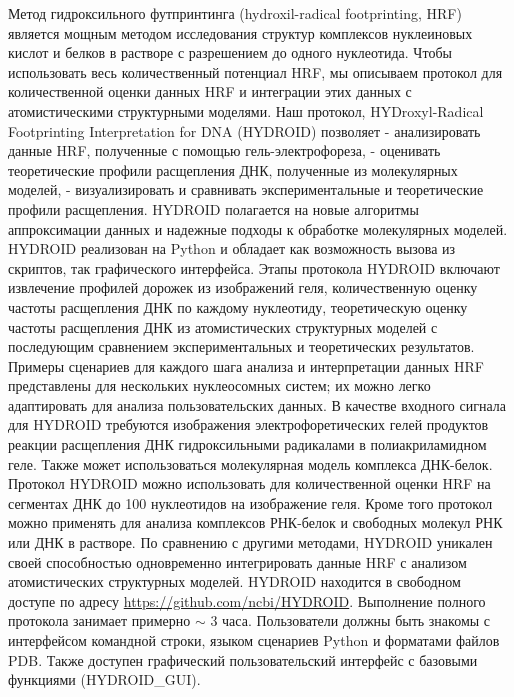 
Метод гидроксильного футпринтинга (hydroxil-radical footprinting, HRF) является мощным методом исследования структур комплексов нуклеиновых кислот и белков в растворе с разрешением до одного нуклеотида. Чтобы использовать весь количественный потенциал HRF, мы описываем протокол для количественной оценки данных HRF и интеграции этих данных с атомистическими структурными моделями. Наш протокол, HYDroxyl-Radical Footprinting Interpretation for DNA (HYDROID) позволяет - анализировать данные HRF, полученные с помощью гель-электрофореза, - оценивать теоретические профили расщепления ДНК, полученные из молекулярных моделей, - визуализировать и сравнивать экспериментальные и теоретические профили расщепления. HYDROID полагается на новые алгоритмы аппроксимации данных и надежные подходы к обработке молекулярных моделей. HYDROID реализован на Python и обладает как возможность вызова из скриптов, так графического интерфейса. Этапы протокола HYDROID включают извлечение профилей дорожек из изображений геля, количественную оценку частоты расщепления ДНК по каждому нуклеотиду, теоретическую оценку частоты расщепления ДНК из атомистических структурных моделей с последующим сравнением экспериментальных и теоретических результатов. Примеры сценариев для каждого шага анализа и интерпретации данных HRF представлены для нескольких нуклеосомных систем; их можно легко адаптировать для анализа пользовательских данных. В качестве входного сигнала для HYDROID требуются изображения электрофоретических гелей продуктов реакции расщепления ДНК гидроксильными радикалами в полиакриламидном геле. Также может использоваться молекулярная модель комплекса ДНК-белок. Протокол HYDROID можно использовать для количественной оценки HRF на сегментах ДНК до 100 нуклеотидов на изображение геля. Кроме того протокол можно применять для анализа комплексов РНК-белок и свободных молекул РНК или ДНК в растворе. По сравнению с другими методами, HYDROID уникален своей способностью одновременно интегрировать данные HRF с анализом атомистических структурных моделей. HYDROID находится в свободном доступе по адресу \url{https://github.com/ncbi/HYDROID}. Выполнение полного протокола занимает примерно $\sim$ 3 часа. Пользователи должны быть знакомы с интерфейсом командной строки, языком сценариев Python и форматами файлов PDB. Также доступен графический пользовательский интерфейс с базовыми функциями (HYDROID\_GUI).


